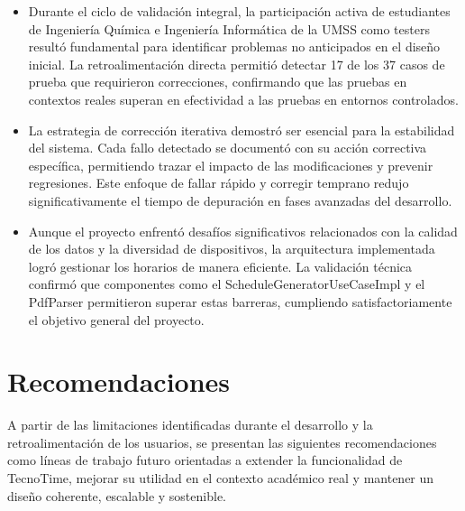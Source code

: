 \begin{itemize}
\item Durante el ciclo de validación integral, la participación activa de estudiantes de Ingeniería Química e Ingeniería Informática de la UMSS como testers resultó fundamental para identificar problemas no anticipados en el diseño inicial. La retroalimentación directa permitió detectar 17 de los 37 casos de prueba que requirieron correcciones, confirmando que las pruebas en contextos reales superan en efectividad a las pruebas en entornos controlados.

\item La estrategia de corrección iterativa demostró ser esencial para la estabilidad del sistema. Cada fallo detectado se documentó con su acción correctiva específica, permitiendo trazar el impacto de las modificaciones y prevenir regresiones. Este enfoque de fallar rápido y corregir temprano redujo significativamente el tiempo de depuración en fases avanzadas del desarrollo.

\item Aunque el proyecto enfrentó desafíos significativos relacionados con la calidad de los datos y la diversidad de dispositivos, la arquitectura implementada logró gestionar los horarios de manera eficiente. La validación técnica confirmó que componentes como el ScheduleGeneratorUseCaseImpl y el PdfParser permitieron superar estas barreras, cumpliendo satisfactoriamente el objetivo general del proyecto.

\end{itemize}

\section{Recomendaciones}

\noindent A partir de las limitaciones identificadas durante el desarrollo y la retroalimentación de los usuarios, se presentan las siguientes recomendaciones como líneas de trabajo futuro orientadas a extender la funcionalidad de TecnoTime, mejorar su utilidad en el contexto académico real y mantener un diseño coherente, escalable y sostenible.

